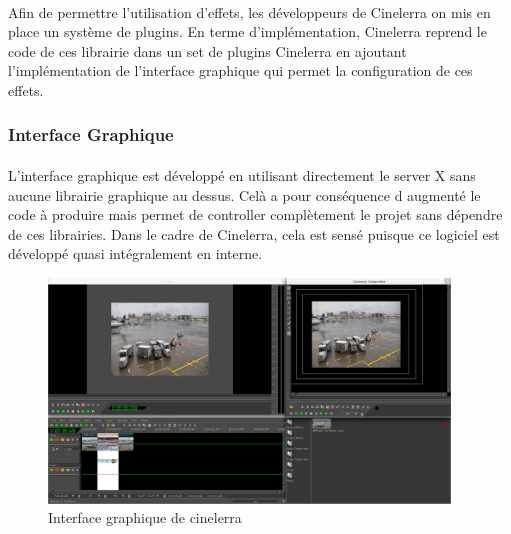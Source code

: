 \paragraph{}

Afin de permettre l'utilisation d'effets, les développeurs de Cinelerra
on mis en place un système de plugins. En terme d'implémentation,
Cinelerra reprend le code de ces librairie dans un set de plugins
Cinelerra en ajoutant l'implémentation de l'interface graphique qui
permet la configuration de ces effets.

\subsubsection{Interface Graphique}

\paragraph{}

L'interface graphique est développé en utilisant directement le server
X sans aucune librairie graphique au dessus. Celà a pour conséquence
d augmenté le code à produire mais permet de controller complètement
le projet sans dépendre de ces librairies.  Dans le cadre de Cinelerra,
cela est sensé puisque ce logiciel est développé quasi intégralement
en interne.

\begin{figure} [H]

  \begin{center}

    \includegraphics[width=0.95\textwidth]{images/cinelerra}

  \end{center}

  \caption{Interface graphique de cinelerra}

  \label{Yes}

\end{figure}

